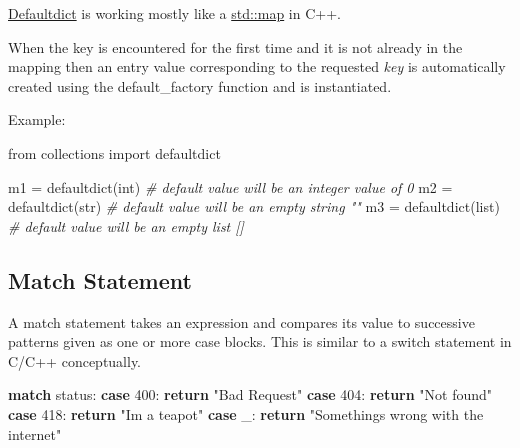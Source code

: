 \documentclass[
]{article}
\newenvironment{Shaded}{}{}
\newcommand{\BuiltInTok}[1]{#1}
\newcommand{\CommentTok}[1]{\textcolor[rgb]{0.38,0.63,0.69}{\textit{#1}}}
\newcommand{\ControlFlowTok}[1]{\textcolor[rgb]{0.00,0.44,0.13}{\textbf{#1}}}
\newcommand{\DecValTok}[1]{\textcolor[rgb]{0.25,0.63,0.44}{#1}}
\newcommand{\ImportTok}[1]{#1}
\newcommand{\NormalTok}[1]{#1}
\newcommand{\OperatorTok}[1]{\textcolor[rgb]{0.40,0.40,0.40}{#1}}
\newcommand{\StringTok}[1]{\textcolor[rgb]{0.25,0.44,0.63}{#1}}
\begin{document}
\href{https://docs.python.org/3/library/collections.html\#collections.defaultdict}{Defaultdict}
is working mostly like a
\href{https://en.cppreference.com/w/cpp/container/map}{std::map} in C++.

When the key is encountered for the first time and it is not already in
the mapping then an entry value corresponding to the requested
\emph{key} is automatically created using the default\_factory function
and is instantiated.

Example:

\begin{Shaded}
\begin{Highlighting}[]
\ImportTok{from}\NormalTok{ collections }\ImportTok{import}\NormalTok{ defaultdict}

\NormalTok{m1 }\OperatorTok{=}\NormalTok{ defaultdict(}\BuiltInTok{int}\NormalTok{) }
\CommentTok{\# default value will be an integer value of 0}
\NormalTok{m2 }\OperatorTok{=}\NormalTok{ defaultdict(}\BuiltInTok{str}\NormalTok{)}
\CommentTok{\# default value will be an empty string ""}
\NormalTok{m3 }\OperatorTok{=}\NormalTok{ defaultdict(}\BuiltInTok{list}\NormalTok{)}
\CommentTok{\# default value will be an empty list []}
\end{Highlighting}
\end{Shaded}

\hypertarget{match-statement}{%
\subsection{Match Statement}\label{match-statement}}

A match statement takes an expression and compares its value to
successive patterns given as one or more case blocks. This is similar to
a switch statement in C/C++ conceptually.

\begin{Shaded}
\begin{Highlighting}[]
 \ControlFlowTok{match}\NormalTok{ status:}
        \ControlFlowTok{case} \DecValTok{400}\NormalTok{:}
            \ControlFlowTok{return} \StringTok{"Bad Request"}
        \ControlFlowTok{case} \DecValTok{404}\NormalTok{:}
            \ControlFlowTok{return} \StringTok{"Not found"}
        \ControlFlowTok{case} \DecValTok{418}\NormalTok{:}
            \ControlFlowTok{return} \StringTok{"I\textquotesingle{}m a teapot"}
        \ControlFlowTok{case}\NormalTok{ \_:}
            \ControlFlowTok{return} \StringTok{"Something\textquotesingle{}s wrong with the internet"}
\end{Highlighting}
\end{Shaded}
\end{document}

